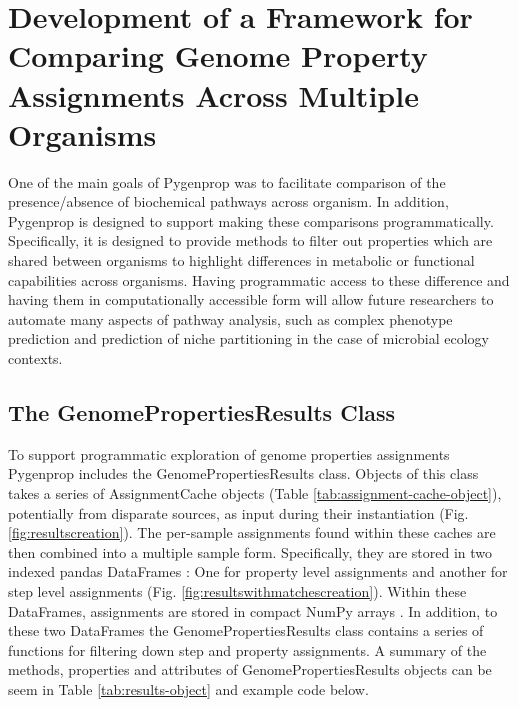 \section{Development of a Framework for Comparing Genome Property Assignments Across Multiple Organisms} \label{GenomePropertiesResults}

One of the main goals of Pygenprop was to facilitate comparison of the presence/absence of biochemical pathways across organism. In addition, Pygenprop is designed to support making these comparisons programmatically. Specifically, it is designed to provide methods to filter out properties which are shared between organisms to highlight differences in metabolic or functional capabilities across organisms. Having programmatic access to these difference and having them in computationally accessible form will allow future researchers to automate many aspects of pathway analysis, such as complex phenotype prediction and prediction of niche partitioning in the case of microbial ecology contexts.

\subsection{The GenomePropertiesResults Class}

To support programmatic exploration of genome properties assignments Pygenprop includes the GenomePropertiesResults class. Objects of this class takes a series of AssignmentCache objects (Table \ref{tab:assignment-cache-object}), potentially from disparate sources, as input during their instantiation (Fig. \ref{fig:resultscreation}). The per-sample assignments found within these caches are then combined into a multiple sample form. Specifically, they are stored in two indexed pandas DataFrames \cite{mckinney2010data}: One for property level assignments and another for step level assignments (Fig. \ref{fig:resultswithmatchescreation}). Within these DataFrames, assignments are stored in compact NumPy arrays \cite{van2011numpy}. In addition, to these two DataFrames the GenomePropertiesResults class contains a series of functions for filtering down step and property assignments. A summary of the methods, properties and attributes of GenomePropertiesResults objects can be seem in Table \ref{tab:results-object} and example code below.

